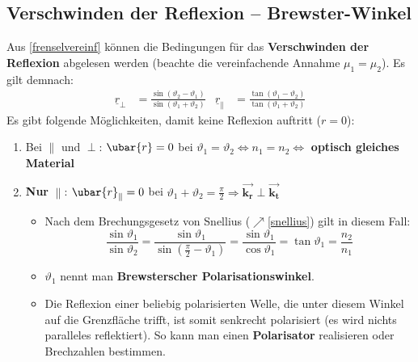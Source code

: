   \subsection{Verschwinden der Reflexion -- Brewster-Winkel}
		  Aus \ref{frenselvereinf} können die Bedingungen für das \textbf{Verschwinden der Reflexion} abgelesen werden (beachte die vereinfachende Annahme \(\mu_1 = \mu_2\)). Es gilt demnach:
		        \begin{align}
			        \underline{r}_\perp & = \frac{\sin\left(\vartheta_2-\vartheta_1\right)}{\sin\left(\vartheta_1+\vartheta_2\right)} & \underline{r}_\parallel & = \frac{\tan\left(\vartheta_1-\vartheta_2\right)}{\tan\left(\vartheta_1+\vartheta_2\right)}
		        \end{align}
		        Es gibt folgende Möglichkeiten, damit keine Reflexion auftritt ($r=0$):
		   \begin{enumerate}
		   	\item Bei $\parallel$ und $\perp$: $\ubar{r}=0$ bei $\vartheta_1=\vartheta_2\Leftrightarrow n_1=n_2\Leftrightarrow$ \textbf{optisch gleiches Material}
		   	\item \textbf{Nur} $\parallel$: $\ubar{r}_\parallel=0$ bei $\vartheta_1+\vartheta_2=\frac{\pi}{2}\Rightarrow \vec{\bm{k_r}} \perp \vec{\bm{k_t}}$
		   	\begin{itemize}
		   		\item[] Nach dem Brechungsgesetz von Snellius ($\nearrow$\ref{snellius}) gilt in diesem Fall:		   	
		   	\begin{equation}
		   		\frac{\sin\vartheta_1}{\sin\vartheta_2} = \frac{\sin\vartheta_1}{\sin\left(\frac{\pi}{2}-\vartheta_1\right)} = \frac{\sin\vartheta_1}{\cos\vartheta_1} = \boxed{\tan\vartheta_1=\frac{n_2}{n_1} }
		   	\end{equation}
		   	\item[]$\vartheta_{1}$ nennt man \textbf{Brewsterscher Polarisationswinkel}.
		   	\item[]Die Reflexion einer beliebig polarisierten Welle, die unter diesem Winkel auf die Grenzfläche trifft, ist somit senkrecht polarisiert (es wird nichts paralleles reflektiert). So kann man einen \textbf{Polarisator} realisieren oder Brechzahlen bestimmen.
		   	\end{itemize}
		   \end{enumerate}
